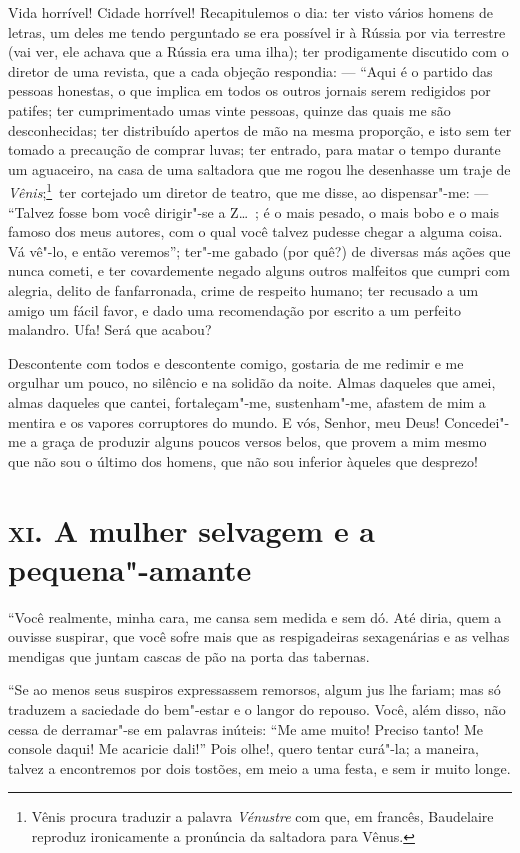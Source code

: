 Vida horrível! Cidade horrível! Recapitulemos o dia: ter visto vários
homens de letras, um deles me tendo perguntado se era possível
ir à Rússia por via terrestre (vai ver, ele achava que a Rússia era
uma ilha); ter prodigamente discutido com o diretor de uma revista,
que a cada objeção respondia: --- ``Aqui é o partido das
pessoas honestas, o que implica em todos os outros
jornais serem redigidos por patifes; ter cumprimentado umas vinte
pessoas, quinze das quais me são desconhecidas; ter distribuído
apertos de mão na mesma proporção, e isto sem ter tomado a precaução de
comprar luvas; ter entrado, para matar o tempo durante um aguaceiro,
na casa de uma saltadora que me rogou lhe desenhasse um traje de \textit{
Vênis};\footnote{  Vênis procura traduzir a palavra \textit{Vénustre} com que, em francês,
Baudelaire reproduz ironicamente a pronúncia da saltadora para Vênus.}~ter cortejado um diretor de teatro, que me
disse, ao dispensar"-me: --- “Talvez fosse bom você
dirigir"-se a Z\ldots\ ; é o mais pesado, o mais bobo e o mais famoso dos
meus autores, com o qual você talvez pudesse 
chegar a alguma coisa. Vá
vê"-lo, e então veremos''; ter"-me gabado (por
quê?) de diversas más ações que nunca cometi, e ter covardemente negado
alguns outros malfeitos que cumpri com alegria, delito de fanfarronada,
crime de respeito humano; ter recusado a um amigo um fácil favor, e
dado uma recomendação por escrito a um perfeito malandro. Ufa! Será que
acabou?

Descontente com todos e descontente comigo, gostaria de me redimir
e me orgulhar um pouco, no silêncio e na solidão da noite. Almas
daqueles que amei, almas daqueles que cantei, fortaleçam"-me,
sustenham"-me, afastem de mim a mentira e os vapores corruptores do
mundo. E vós, Senhor, meu Deus! Concedei"-me a graça de produzir alguns
poucos versos belos, que provem a mim mesmo que não sou o último dos
homens, que não sou inferior àqueles que desprezo!

\chapter{\textsc{xi.} A mulher selvagem e a pequena"-amante}

“Você realmente, minha cara, me cansa sem medida e
sem dó. Até diria, quem a ouvisse suspirar, que você sofre mais que
as respigadeiras sexagenárias e as velhas mendigas que juntam cascas de
pão na porta das tabernas.

“Se ao menos seus suspiros expressassem remorsos, algum
jus lhe fariam; mas só traduzem a saciedade do bem"-estar e o
langor do repouso. Você, além disso, não cessa de derramar"-se em
palavras inúteis: ``Me ame muito! Preciso tanto! Me
console daqui! Me acaricie dali!'' Pois olhe!, quero tentar
curá"-la; a maneira, talvez a encontremos por dois tostões, em meio a
uma festa, e sem ir muito longe.

